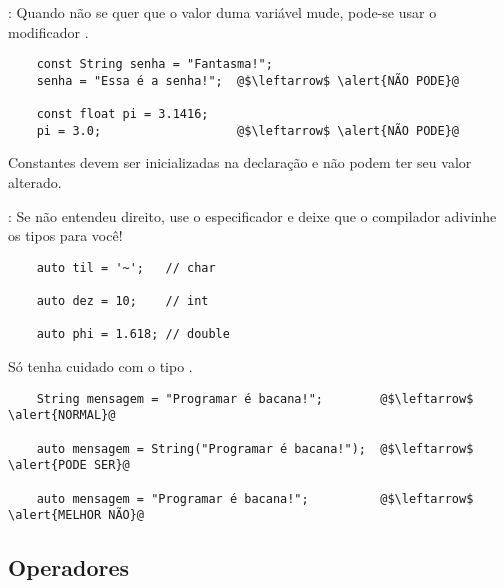 \begin{frame}[fragile]{\insertsection: \insertsubsection}
  Quando não se quer que o valor duma variável mude, pode-se usar o modificador \texttt{}.
  \begin{verbatim}
    const String senha = "Fantasma!";
    senha = "Essa é a senha!";  @$\leftarrow$ \alert{NÃO PODE}@

    const float pi = 3.1416;
    pi = 3.0;                   @$\leftarrow$ \alert{NÃO PODE}@
  \end{verbatim}


  Constantes devem ser inicializadas na declaração e não podem ter seu valor alterado.
\end{frame}


\begin{frame}[fragile]{\insertsection: \insertsubsection}
  Se não entendeu direito, use o especificador \texttt{} e deixe que o compilador adivinhe os tipos para você!
  \begin{verbatim}
    auto til = '~';   // char

    auto dez = 10;    // int

    auto phi = 1.618; // double
  \end{verbatim}

  \pause
  \bigskip
  Só tenha cuidado com o tipo \texttt{}.
  \begin{verbatim}
    String mensagem = "Programar é bacana!";        @$\leftarrow$ \alert{NORMAL}@

    auto mensagem = String("Programar é bacana!");  @$\leftarrow$ \alert{PODE SER}@

    auto mensagem = "Programar é bacana!";          @$\leftarrow$ \alert{MELHOR NÃO}@
  \end{verbatim}
\end{frame}


\subsection{Operadores}


